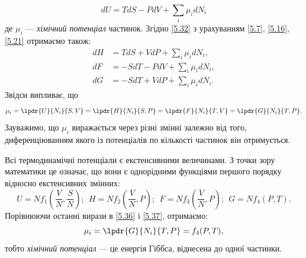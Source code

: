 \begin{equation}\label{5.32}
	dU = TdS - PdV + \sum_{i}\mu_{i}dN_i
\end{equation}
де $\mu_{i}$ --- \emph{хімічний потенціал} частинок. Згідно \eqref{5.32} з урахуванням \eqref{5.7},
\eqref{5.16}, \eqref{5.21} отримаємо також:
\begin{align}
	dH & = TdS + VdP + \sum_{i}\mu_{i}dN_i, \label{5.33} \\
	dF & = -SdT -PdV +\sum_{i}\mu_{i}dN_i,  \label{5.34} \\
	dG & = -SdT +VdP +\sum_{i}\mu_{i}dN_i.  \label{5.35}
\end{align}
Звідси випливає, що
\begin{equation}\label{5.36}
	\mu_{i} = \lpdr{U}{N_{i}}{S,V} = \lpdr{H}{N_{i}}{S,P} = \lpdr{F}{N_{i}}{T,V} = \lpdr{G}{N_{i}}{T,P}.
\end{equation}
Зауважимо, що $\mu_{i}$ виражається через різні змінні залежно від того, диференціюванням якого із потенціалів по кількості частинок він отримується.

Всі термодинамічні потенціали є екстенсивними величинами. З точки зору математики це означає, що вони є однорідними функціями першого порядку відносно екстенсивних змінних:
\begin{equation}\label{5.37}
	U = Nf_1\left(\dfrac{V}{N},\dfrac{S}{N}\right); \ \
	H = Nf_2\left(\dfrac{V}{N},P\right); \ \
	F = Nf_3\left(\dfrac{V}{N},P\right); \ \
	G = Nf_4\left(P,T\right).
\end{equation}
Порівнюючи останні вирази в \eqref{5.36} і \eqref{5.37}, отримаємо:
\begin{equation}\label{5.38}
	\mu_{i} = \lpdr{G}{N_{i}}{T,P}=f_4(P,T),
\end{equation}
тобто \emph{хімічний потенціал} --- це енергія Гіббса, віднесена до одної частинки.

